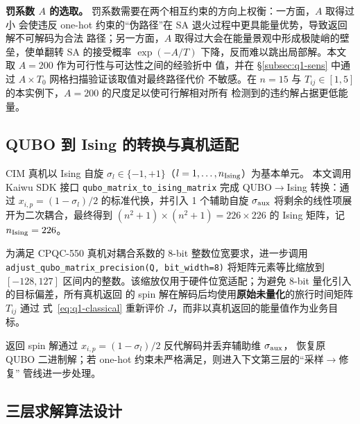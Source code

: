 \documentclass[UTF8,12pt,a4paper]{ctexart}
\begin{document}
\textbf{罚系数 $A$ 的选取。} 罚系数需要在两个相互约束的方向上权衡：一方面，$A$ 取得过小
会使违反 one-hot 约束的``伪路径''在 SA 退火过程中更具能量优势，导致返回解不可解码为合法
路径；另一方面，$A$ 取得过大会在能量景观中形成极陡峭的壁垒，使单翻转 SA 的接受概率
$\exp(-A/T)$ 下降，反而难以跳出局部解。本文取 $A=200$ 作为可行性与可达性之间的经验折中
值，并在 §\ref{subsec:q1-sens} 中通过 $A\times T_{0}$ 网格扫描验证该取值对最终路径代价
不敏感。在 $n=15$ 与 $T_{ij}\in[1,5]$ 的本实例下，$A=200$ 的尺度足以使可行解相对所有
检测到的违约解占据更低能量。

\subsection{QUBO 到 Ising 的转换与真机适配}

CIM 真机以 Ising 自旋 $\sigma_{l}\in\{-1,+1\}$（$l=1,\dots,n_{\rm Ising}$）为基本单元。
本文调用 Kaiwu SDK 接口 \texttt{qubo\_matrix\_to\_ising\_matrix} 完成 QUBO$\to$Ising
转换\cite{kadowaki1998qa,kaiwusdk2024}：通过 $x_{i,p}=(1-\sigma_{l})/2$ 的标准代换，并引入 1 个辅助自旋 $\sigma_{\rm aux}$
将剩余的线性项展开为二次耦合，最终得到 $(n^{2}+1)\times(n^{2}+1)=226\times 226$ 的 Ising
矩阵，记 $n_{\rm Ising}=226$。

为满足 CPQC-550 真机对耦合系数的 8-bit 整数位宽要求，进一步调用
\texttt{adjust\_qubo\_matrix\_precision(Q, bit\_width=8)} 将矩阵元素等比缩放到 $[-128,127]$
区间内的整数。该缩放仅用于硬件位宽适配；为避免 8-bit 量化引入的目标偏差，所有真机返回
的 spin 解在解码后均使用\textbf{原始未量化}的旅行时间矩阵 $T_{ij}$ 通过
式~\eqref{eq:q1-classical} 重新评价 $J$，而非以真机返回的能量值作为业务目标。

返回 spin 解通过 $x_{i,p}=(1-\sigma_{l})/2$ 反代解码并丢弃辅助维 $\sigma_{\rm aux}$，
恢复原 QUBO 二进制解；若 one-hot 约束未严格满足，则进入下文第三层的``采样$\to$修复''
管线进一步处理。

\subsection{三层求解算法设计}
\label{subsec:q1-algo}
\end{document}
